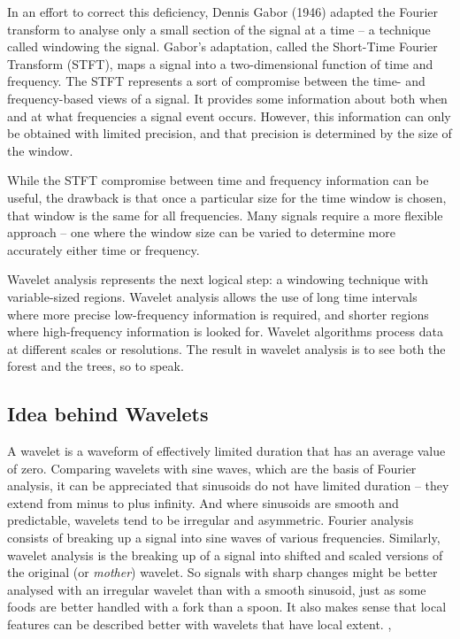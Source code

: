 \documentclass[a4paper,11pt]{article}
\begin{document}
In an effort to correct this deficiency, Dennis Gabor (1946) adapted the Fourier transform to analyse only a small section of the signal at a time -- a technique called windowing the signal. Gabor's adaptation, called the Short-Time Fourier Transform (STFT), maps a signal into a two-dimensional function of time and frequency. The STFT represents a sort of compromise between the time- and frequency-based views of a signal. It provides some information about both when and at what frequencies a signal event occurs. However, this information can only be obtained with limited precision, and that precision is determined by the size of the window.

While the STFT compromise between time and frequency information can be useful, the drawback is that once a particular size for the time window is chosen, that window is the same for all frequencies. Many signals require a more flexible approach -- one where the window size can be varied to determine more accurately either time or frequency.

Wavelet analysis represents the next logical step: a windowing technique with variable-sized regions. Wavelet analysis allows the use of long time intervals where more precise low-frequency information is required, and shorter regions where high-frequency information is looked for. Wavelet algorithms process data at different scales or resolutions. The result in wavelet analysis is to see both the forest and the trees, so to speak. \cite{amara}

\subsection{Idea behind Wavelets}
A wavelet is a waveform of effectively limited duration that has an average value of zero. Comparing wavelets with sine waves, which are the basis of Fourier analysis, it  can be appreciated that sinusoids do not have limited duration -- they extend from minus to plus infinity. And where sinusoids are smooth and predictable, wavelets tend to be irregular and asymmetric. Fourier analysis consists of breaking up a signal into sine waves of various frequencies. Similarly, wavelet analysis is the breaking up of a signal into shifted and scaled versions of the original (or \emph{mother}) wavelet. So signals with sharp changes might be better analysed with an irregular wavelet than with a smooth sinusoid, just as some foods are better handled with a fork than a spoon. It also makes sense that local features can be described better with wavelets that have local extent. \cite{pswbook},\cite{waveletug}
\end{document}
